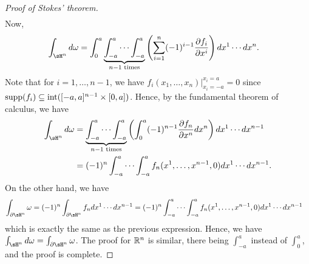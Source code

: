 \begin{proof}[Proof of Stokes' theorem]
\begin{align}
    \end{align}
    Now,
    \begin{align}
        \int_{\sH^{n}} d\omega &= \int_{0}^{a} \underbrace{\int_{-a}^{a} \cdots \int_{-a}^{a}}_{n-1 \text{ times}} \left(\sum_{i=1}^{n} (-1)^{i-1} \frac{\partial f_{i}}{\partial x^{i}}\right) dx^{1} \cdots dx^{n}.
    \end{align}
    Note that for $i = 1,\ldots,n-1$, we have $f_{i}(x_{1},\ldots,x_{n}) |_{x_{i}= -a}^{x_{i}=a} = 0$ since $\operatorname{supp}(f_{i}) \subseteq \operatorname{int}([-a,a]^{n-1} \times [0,a])$. Hence, by the fundamental theorem of calculus, we have
    \begin{align}
        \int_{\sH^{n}} d\omega &= \underbrace{\int_{-a}^{a} \cdots \int_{-a}^{a}}_{n-1 \text{ times}} \left( \int_{0}^{a} (-1)^{n-1} \frac{\partial f_{n}}{\partial x^{n}} dx^{n} \right) dx^{1} \cdots dx^{n-1} \notag \\
        &= (-1)^{n} \int_{-a}^{a} \cdots \int_{-a}^{a} f_{n}(x^{1},\ldots,x^{n-1},0) dx^{1} \cdots dx^{n-1}.
    \end{align}
    On the other hand, we have
    \begin{align}
        \int_{\partial \sH^{n}} \omega &= (-1)^{n} \int_{\partial \sH^{n}} f_{n} dx^{1} \cdots dx^{n-1} = (-1)^{n} \int_{-a}^{a} \cdots \int_{-a}^{a} f_{n}(x^{1},\ldots,x^{n-1},0) dx^{1} \cdots dx^{n-1}
    \end{align}
    which is exactly the same as the previous expression. Hence, we have $\int_{\sH^{n}} d\omega = \int_{\partial \sH^{n}} \omega$. The proof for $\mathbb{R}^{n}$ is similar, there being $\int_{-a}^{a}$ instead of $\int_{0}^{a}$, and the proof is complete.
\end{proof}
